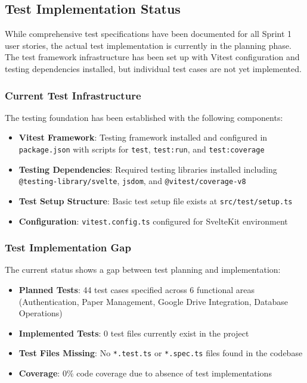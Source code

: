 \documentclass[12pt]{article}
\begin{document}
\subsection{Test Implementation Status}

While comprehensive test specifications have been documented for all Sprint 1 user stories, the actual test implementation is currently in the planning phase. The test framework infrastructure has been set up with Vitest configuration and testing dependencies installed, but individual test cases are not yet implemented.

\subsubsection{Current Test Infrastructure}
The testing foundation has been established with the following components:

\begin{itemize}
  \item \textbf{Vitest Framework}: Testing framework installed and configured in \texttt{package.json} with scripts for \texttt{test}, \texttt{test:run}, and \texttt{test:coverage}
  \item \textbf{Testing Dependencies}: Required testing libraries installed including \texttt{@testing-library/svelte}, \texttt{jsdom}, and \texttt{@vitest/coverage-v8}
  \item \textbf{Test Setup Structure}: Basic test setup file exists at \texttt{src/test/setup.ts}
  \item \textbf{Configuration}: \texttt{vitest.config.ts} configured for SvelteKit environment
\end{itemize}

\subsubsection{Test Implementation Gap}
The current status shows a gap between test planning and implementation:

\begin{itemize}
  \item \textbf{Planned Tests}: 44 test cases specified across 6 functional areas (Authentication, Paper Management, Google Drive Integration, Database Operations)
  \item \textbf{Implemented Tests}: 0 test files currently exist in the project
  \item \textbf{Test Files Missing}: No \texttt{*.test.ts} or \texttt{*.spec.ts} files found in the codebase
  \item \textbf{Coverage}: 0\% code coverage due to absence of test implementations
\end{itemize}
\end{document}
